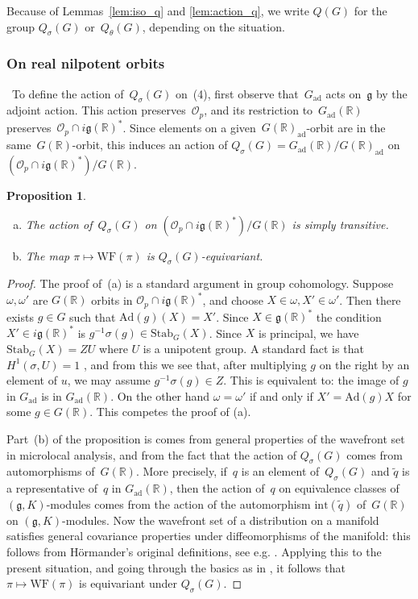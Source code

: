 \documentclass[cupthm]{CUP-JNL-JMJ}
\numberwithin{equation}{section}
\theoremstyle{cupplain}
\newtheorem{proposition}{Proposition}[section]
\theoremstyle{cupdefinition}
\theoremstyle{cupremark}
\theoremstyle{cupproof}
\newtheorem{proof}{Proof}
\newcommand{\Ad}{\mathrm{Ad}}
\newcommand{\Gad}{G_\mathrm{ad}}
\newcommand{\Stab}{\mathrm{Stab}}
\renewcommand{\O}{\mathcal O}
\newcommand{\R}{\mathbb R}
\newcommand{\g}{\mathfrak g}
\newcommand\inv{^{-1}}
\newcommand{\WF}{\mathrm{WF}}
\newcommand{\Op}{\O_p}
\begin{document}
Because of Lemmas~\ref{lem:iso_q} and \ref{lem:action_q}, we write $Q(G)$ for the group $Q_\sigma(G)$ or~$Q_\theta(G)$, depending on the situation.



\subsubsection{On real nilpotent orbits}~To define the action of~$Q_{\sigma}(G)$ on~(4), first observe that~$\Gad$ acts on~$\g$ by the adjoint action. This action preserves~$\Op$, and its restriction to~$\Gad(\R)$ preserves~$\Op\cap i\g(\R)^*$. Since elements on a given~$G(\R)_{\mathrm{ad}}$-orbit are in the same~$G(\R)$-orbit, this induces an action of $Q_{\sigma}(G)=\Gad(\R)/G(\R)_{\mathrm{ad}}$ on~$(\Op\cap i\g(\R)^*)/G(\R)$.

\begin{proposition}\label{prop:action_on_real_orbits}~
\begin{enumerate}[(a)] 
\item The action of~$Q_{\sigma}(G)$ on $(\Op\cap i\g(\R)^*)/G(\R)$ is simply transitive.
\item The map $\pi \mapsto \WF(\pi)$ is $Q_{\sigma}(G)$-equivariant.
\end{enumerate}
\end{proposition}

\begin{proof}
The proof of~(a) is a standard argument in group cohomology. Suppose $\omega,\omega'$ are $G(\R)$ orbits in $\Op\cap i\g(\R)^*$,
and choose $X\in \omega,X'\in\omega'$. Then there exists $g\in G$ such that $\Ad(g)(X)=X'$. Since $X\in \g(\R)^*$ the condition $X'\in i\g(\R)^*$ 
is $g\inv \sigma(g)\in \Stab_G(X)$.  Since $X$ is principal, we have $\Stab_G(X)=ZU$ where $U$ is a unipotent group. 
A standard fact is that $H^1(\sigma, U)=1$ \cite[Chap.~III, Proposition~6]{Serre_Galois}, and from this we see that, after multiplying $g$ on the right by an element of $u$, we may assume $g\inv \sigma(g)\in Z$. This is equivalent to: the image of $g$ in $\Gad$ is in $\Gad(\R)$. On the other hand $\omega=\omega'$ 
if and only if $X'=\Ad(g)X$ for some $g\in G(\R)$. This competes the proof of (a).

Part~(b) of the proposition is comes from general properties of the wavefront set in microlocal analysis, and from the fact that the action of $Q_{\sigma}(G)$ comes from automorphisms of~$G(\R)$. More precisely, if~$q$ is an element of~$Q_{\sigma}(G)$ and $\tilde{q}$ is a representative of~$q$ in $\Gad(\R)$, then the action of~$q$ on equivalence classes of $(\g, K)$-modules comes from the action of the automorphism $\mathrm{int}(\tilde{q})$ of~$G(\R)$ on $(\g, K)$-modules. Now the wavefront set of a distribution on a manifold satisfies general covariance properties under diffeomorphisms of the manifold: this follows from Hörmander's original definitions, see e.g. \cite[Sect.~2, p.~800]{HarrisHeOlafsson}. Applying this to the present situation, and going through the basics as in   \cite[Sect.~2]{HarrisHeOlafsson}, it follows that $\pi \mapsto \WF(\pi)$ is equivariant under $Q_{\sigma}(G)$.
\end{proof}
\end{document}
